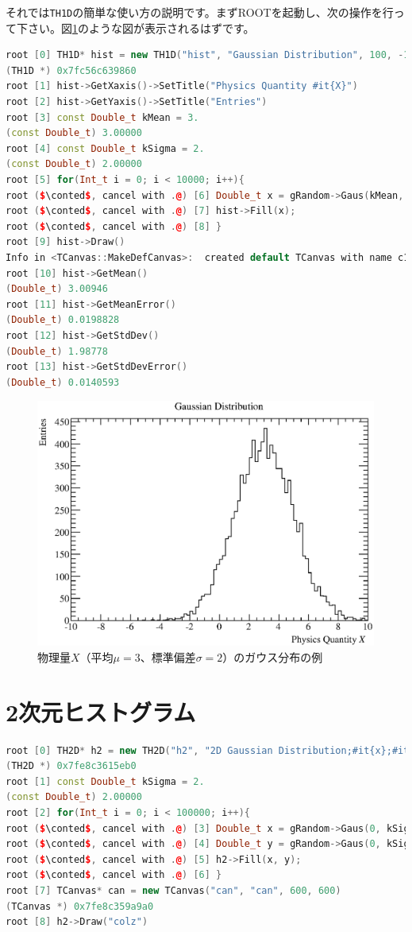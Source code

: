 それでは\texttt{TH1D}の簡単な使い方の説明です。まずROOTを起動し、次の操作を行って下さい。図\ref{fig:TH1D_eps}のような図が表示されるはずです。

\begin{lstlisting}[language=c++,mathescape]
root [0] TH1D* hist = new TH1D("hist", "Gaussian Distribution", 100, -10, 10)
(TH1D *) 0x7fc56c639860
root [1] hist->GetXaxis()->SetTitle("Physics Quantity #it{X}")
root [2] hist->GetYaxis()->SetTitle("Entries")
root [3] const Double_t kMean = 3.
(const Double_t) 3.00000
root [4] const Double_t kSigma = 2.
(const Double_t) 2.00000
root [5] for(Int_t i = 0; i < 10000; i++){
root ($\conted$, cancel with .@) [6] Double_t x = gRandom->Gaus(kMean, kSigma);
root ($\conted$, cancel with .@) [7] hist->Fill(x);
root ($\conted$, cancel with .@) [8] }
root [9] hist->Draw()
Info in <TCanvas::MakeDefCanvas>:  created default TCanvas with name c1
root [10] hist->GetMean()
(Double_t) 3.00946
root [11] hist->GetMeanError()
(Double_t) 0.0198828
root [12] hist->GetStdDev()
(Double_t) 1.98778
root [13] hist->GetStdDevError()
(Double_t) 0.0140593
\end{lstlisting}

\begin{figure}
  \centering
  \includegraphics[width=12cm,clip]{fig/TH1D.eps}
  \caption{物理量$X$（平均$\mu = 3$、標準偏差$\sigma = 2$）のガウス分布の例}
  \label{fig:TH1D_eps}
\end{figure}

\section{2次元ヒストグラム}

\begin{lstlisting}[language=c++,breaklines=true,mathescape]
root [0] TH2D* h2 = new TH2D("h2", "2D Gaussian Distribution;#it{x};#it{y};Entries", 100, -10, 10, 100, -10, 10)
(TH2D *) 0x7fe8c3615eb0
root [1] const Double_t kSigma = 2.
(const Double_t) 2.00000
root [2] for(Int_t i = 0; i < 100000; i++){
root ($\conted$, cancel with .@) [3] Double_t x = gRandom->Gaus(0, kSigma);
root ($\conted$, cancel with .@) [4] Double_t y = gRandom->Gaus(0, kSigma);
root ($\conted$, cancel with .@) [5] h2->Fill(x, y);
root ($\conted$, cancel with .@) [6] }
root [7] TCanvas* can = new TCanvas("can", "can", 600, 600)
(TCanvas *) 0x7fe8c359a9a0
root [8] h2->Draw("colz")
\end{lstlisting}

